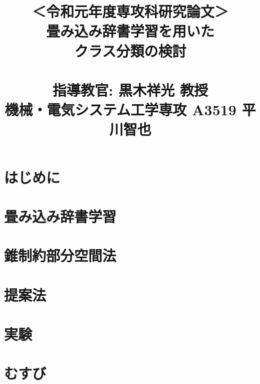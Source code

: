 \documentclass[a4paper,12pt,oneside]{ujbook}
\begin{document}
\title{
	＜令和元年度専攻科研究論文＞\\
	畳み込み辞書学習を用いた\\クラス分類の検討\\　\\
	指導教官: 黒木祥光 教授\\
	機械・電気システム工学専攻 A3519 平川智也
}
\date{}
\maketitle

\tableofcontents

\chapter{はじめに}


\chapter{畳み込み辞書学習}


\chapter{錐制約部分空間法}


\chapter{提案法}


\chapter{実験}


\chapter{むすび}



\end{document}

